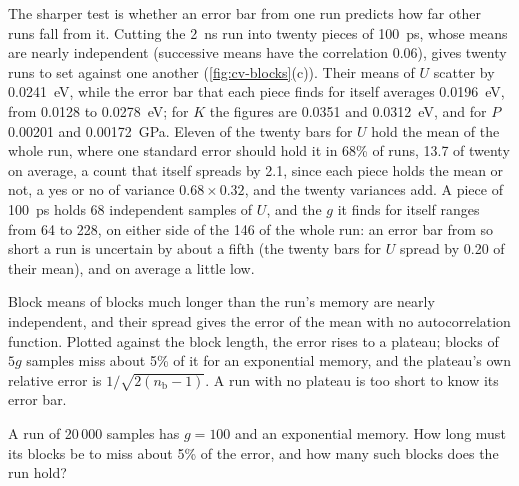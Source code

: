 The sharper test is whether an error bar from one run predicts how far
other runs fall from it. Cutting the \SI{2}{\nano\second} run into twenty
pieces of \SI{100}{\pico\second}, whose means are nearly independent
(successive means have the correlation 0.06), gives twenty runs to set
against one another (\cref{fig:cv-blocks}(c)). Their means of $U$ scatter
by \SI{0.0241}{\electronvolt}, while the error bar that each piece finds
for itself averages \SI{0.0196}{\electronvolt}, from 0.0128 to
\SI{0.0278}{\electronvolt}; for $K$ the figures are 0.0351 and
\SI{0.0312}{\electronvolt}, and for $P$ 0.00201 and
\SI{0.00172}{\giga\pascal}. Eleven of the twenty bars for $U$ hold the mean
of the whole run, where one standard error should hold it in 68\% of
runs, 13.7 of twenty on average, a count that itself spreads by 2.1, since
each piece holds the mean or not, a yes or no of variance $0.68\times0.32$,
and the twenty variances add. A piece of \SI{100}{\pico\second} holds 68
independent samples of $U$, and the $g$ it finds for itself ranges from 64
to 228, on either side of the 146 of the whole run: an error bar from so
short a run is uncertain by about a fifth (the twenty bars for $U$ spread
by 0.20 of their mean), and on average a little low.

\begin{keyidea}
Block means of blocks much longer than the run's memory are nearly
independent, and their spread gives the error of the mean with no
autocorrelation function. Plotted against the block length, the error
rises to a plateau; blocks of $5g$ samples miss about 5\% of it for an
exponential memory, and the
plateau's own relative error is $1/\sqrt{2(n_{\mathrm b} - 1)}$. A run
with no plateau is too short to know its error bar.
\end{keyidea}


\begin{selfcheck}
A run of 20\,000 samples has $g = 100$ and an exponential memory. How long
must its blocks be to miss about 5\% of the error, and how many such
blocks does the run hold?
\end{selfcheck}
